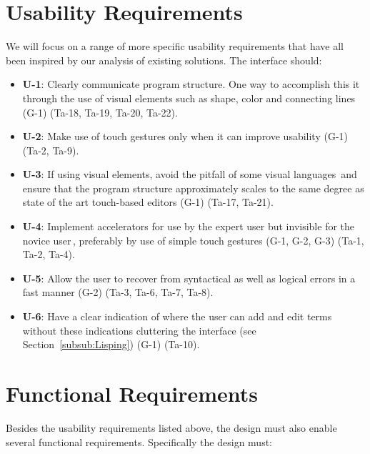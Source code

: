 \section{Usability Requirements} 
\label{sec:usability_requirements}
We will focus on a range of more specific usability requirements that have all been inspired by our analysis of existing
solutions. The interface should:

\begin{itemize}     
	\item \textbf{U-1}: Clearly communicate program structure. One way to accomplish this it through the use of visual elements such as shape, color and connecting lines (G-1)
	(Ta-18, Ta-19, Ta-20, Ta-22).
	\item \textbf{U-2}: Make use of touch gestures only when it can improve usability (G-1)
	(Ta-2, Ta-9).
	\item \textbf{U-3}: If using visual elements, avoid the pitfall of some visual languages\,\cite{green1992visual} and ensure that the program structure approximately scales to the same degree as state of the art touch-based editors (G-1)
	(Ta-17, Ta-21).
	\item \textbf{U-4}: Implement accelerators for use by the expert user but invisible for the novice user\,\cite{nielsen1990heuristic}, preferably by use of simple touch gestures (G-1, G-2, G-3)
	(Ta-1, Ta-2, Ta-4).
	\item \textbf{U-5}: Allow the user to recover from syntactical as well as logical errors in a fast manner (G-2)
	(Ta-3, Ta-6, Ta-7, Ta-8).
	\item \textbf{U-6}: Have a clear indication of where the user can add and edit terms without these indications cluttering the interface (see Section~\ref{subsub:Lisping}) (G-1)
	(Ta-10).
\end{itemize}

\section{Functional Requirements} 
\label{subsec:FunctionalRequirements} 
Besides the usability requirements listed above, the design must also enable several functional requirements. Specifically the design must:

